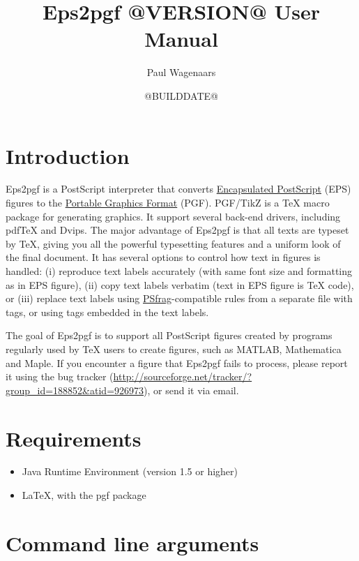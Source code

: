 \documentclass{article}
\title{Eps2pgf @VERSION@ User Manual}
\author{Paul Wagenaars}
\date{@BUILDDATE@}
\begin{document}
    \maketitle
    \tableofcontents

    \section{Introduction}
    Eps2pgf is a PostScript interpreter that converts \href{http://en.wikipedia.org/wiki/Encapsulated_PostScript}{Encapsulated PostScript} (EPS) figures to the \href{http://sourceforge.net/projects/pgf/}{Portable Graphics Format} (PGF). PGF/TikZ is a \TeX{} macro package for generating graphics. It support several back-end drivers, including pdf\TeX{} and Dvips. The major advantage of Eps2pgf is that all texts are typeset by \TeX, giving you all the powerful typesetting features and a uniform look of the final document. It has several options to control how text in figures is handled: (i) reproduce text labels accurately (with same font size and formatting as in EPS figure), (ii) copy text labels verbatim (text in EPS figure is \TeX{} code), or (iii) replace text labels using \href{http://www.ctan.org/tex-archive/help/Catalogue/entries/psfrag.html}{\textsf{PSfrag}}-compatible rules from a separate file with tags, or using tags embedded in the text labels.

    The goal of Eps2pgf is to support all PostScript figures created by programs regularly used by \TeX{} users to create figures, such as MATLAB, Mathematica and Maple. If you encounter a figure that Eps2pgf fails to process, please report it using the bug tracker (\url{http://sourceforge.net/tracker/?group_id=188852&atid=926973}), or send it via email.

    \section{Requirements}
    \begin{itemize}
        \item Java Runtime Environment (version 1.5 or higher)
        \item \LaTeX{}, with the \textsf{pgf} package
    \end{itemize}

    \section{Command line arguments}
\end{document}
